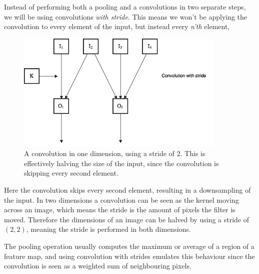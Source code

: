 \documentclass[11pt]{article}
\begin{document}
Instead of performing both a pooling and a convolutions in two separate steps,
we will be using convolutions \textit{with stride}.
This means we won't be applying the convolution to 
every element of the input, but instead every \textit{n'th} element,
\begin{figure}[!h]\label{con2}
    \centering
    \includegraphics[width=10cm]{include/strides.png}
    \caption{A convolution in one dimension, using a stride of 2.
             This is effectively halving the size of the input, since
             the convolution is skipping every second element.}
    \label{fig:conv}
\end{figure}
\newpage
Here the convolution skips every second element, resulting in a downsampling
of the input.
In two dimensions a convolution can be seen as the kernel moving across
an image, which means the stride is the amount of pixels the filter is moved.
Therefore the dimensions of an image can be halved by using a stride of $(2, 2)$, meaning
the stride is performed in both dimensions.

The pooling operation usually computes the maximum or average of a region of
a feature map, and using convolution with strides emulates
this behaviour since the convolution
is seen as a weighted sum of neighbouring pixels.


\end{document}
